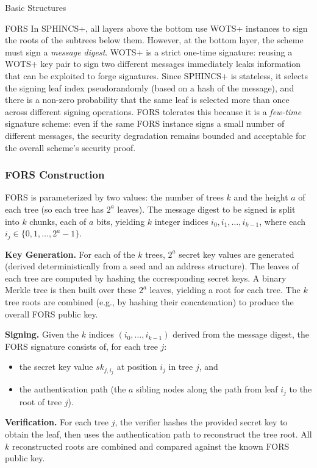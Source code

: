 \documentclass[version=preprint]{iacrcc}
\begin{document}
\begin{section}{Basic Structures}{\label{sec1}}
\begin{subsection}{FORS}
    In SPHINCS+, all layers above the bottom use WOTS+ instances to sign the roots of the subtrees below them. However, at the bottom layer, the scheme must sign a \emph{message digest}. WOTS+ is a strict one-time signature: reusing a WOTS+ key pair to sign two different messages immediately leaks information that can be exploited to forge signatures. Since SPHINCS+ is stateless, it selects the signing leaf index pseudorandomly (based on a hash of the message), and there is a non-zero probability that the same leaf is selected more than once across different signing operations. FORS tolerates this because it is a \emph{few-time} signature scheme: even if the same FORS instance signs a small number of different messages, the security degradation remains bounded and acceptable for the overall scheme's security proof.

    \subsubsection{FORS Construction}

    FORS is parameterized by two values: the number of trees $k$ and the height $a$ of each tree (so each tree has $2^a$ leaves). The message digest to be signed is split into $k$ chunks, each of $a$ bits, yielding $k$ integer indices $i_0, i_1, \ldots, i_{k-1}$, where each $i_j \in \{0, 1, \ldots, 2^a - 1\}$.

    \textbf{Key Generation.}  
    For each of the $k$ trees, $2^a$ secret key values are generated (derived deterministically from a seed and an address structure). The leaves of each tree are computed by hashing the corresponding secret keys. A binary Merkle tree is then built over these $2^a$ leaves, yielding a root for each tree. The $k$ tree roots are combined (e.g., by hashing their concatenation) to produce the overall FORS public key.

    \textbf{Signing.}  
    Given the $k$ indices $(i_0, \ldots, i_{k-1})$ derived from the message digest, the FORS signature consists of, for each tree $j$:
    \begin{itemize}
        \item the secret key value $\mathit{sk}_{j, i_j}$ at position $i_j$ in tree $j$, and
        \item the authentication path (the $a$ sibling nodes along the path from leaf $i_j$ to the root of tree $j$).
    \end{itemize}

    \textbf{Verification.}  
    For each tree $j$, the verifier hashes the provided secret key to obtain the leaf, then uses the authentication path to reconstruct the tree root. All $k$ reconstructed roots are combined and compared against the known FORS public key.


\end{subsection}
\end{section}
\end{document}
